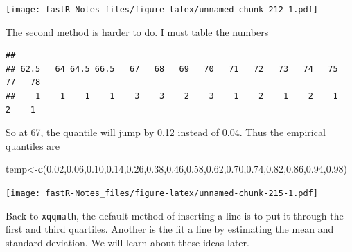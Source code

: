 \documentclass[]{book}
\newenvironment{Shaded}{\begin{snugshade}}{\end{snugshade}}
\newcommand{\KeywordTok}[1]{\textcolor[rgb]{0.13,0.29,0.53}{\textbf{#1}}}
\newcommand{\DataTypeTok}[1]{\textcolor[rgb]{0.13,0.29,0.53}{#1}}
\newcommand{\FloatTok}[1]{\textcolor[rgb]{0.00,0.00,0.81}{#1}}
\newcommand{\StringTok}[1]{\textcolor[rgb]{0.31,0.60,0.02}{#1}}
\newcommand{\OperatorTok}[1]{\textcolor[rgb]{0.81,0.36,0.00}{\textbf{#1}}}
\newcommand{\NormalTok}[1]{#1}
\theoremstyle{definition}
\theoremstyle{definition}
\theoremstyle{definition}
\theoremstyle{remark}
\begin{document}
\texttt{[image: fastR-Notes\_files/figure-latex/unnamed-chunk-212-1.pdf]}

The second method is harder to do. I must table the numbers

\begin{Shaded}
\end{Shaded}

\begin{verbatim}
## 
## 62.5   64 64.5 66.5   67   68   69   70   71   72   73   74   75   77   78 
##    1    1    1    1    3    3    2    3    1    2    1    2    1    2    1
\end{verbatim}

So at 67, the quantile will jump by 0.12 instead of 0.04. Thus the
empirical quantiles are

\begin{Shaded}
\begin{Highlighting}[]
\NormalTok{temp<-}\KeywordTok{c}\NormalTok{(}\FloatTok{0.02}\NormalTok{,}\FloatTok{0.06}\NormalTok{,}\FloatTok{0.10}\NormalTok{,}\FloatTok{0.14}\NormalTok{,}\FloatTok{0.26}\NormalTok{,}\FloatTok{0.38}\NormalTok{,}\FloatTok{0.46}\NormalTok{,}\FloatTok{0.58}\NormalTok{,}\FloatTok{0.62}\NormalTok{,}\FloatTok{0.70}\NormalTok{,}\FloatTok{0.74}\NormalTok{,}\FloatTok{0.82}\NormalTok{,}\FloatTok{0.86}\NormalTok{,}\FloatTok{0.94}\NormalTok{,}\FloatTok{0.98}\NormalTok{)}
\end{Highlighting}
\end{Shaded}

\begin{Shaded}
\end{Shaded}

\texttt{[image: fastR-Notes\_files/figure-latex/unnamed-chunk-215-1.pdf]}

Back to \texttt{xqqmath}, the default method of inserting a line is to
put it through the first and third quartiles. Another is the fit a line
by estimating the mean and standard deviation. We will learn about these
ideas later.
\end{document}
